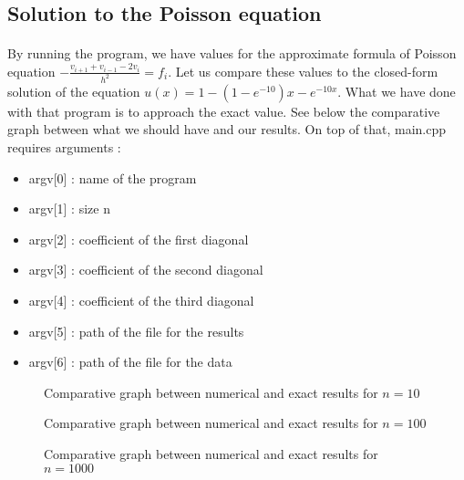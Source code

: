 \documentclass[a4paper, twoside, 11pt]{report}
\theoremstyle{theorem}
\theoremstyle{remark}
\theoremstyle{exemple}
\begin{document}
			\subsection{Solution to the Poisson equation}
			\paragraph{} By running the program, we have values for the approximate formula of Poisson equation $-\frac{v_{i+1} + v_{i-1} - 2v_{i}}{h^2} = f_{i}$. Let us compare these values to the closed-form solution of the equation $u(x) = 1 - ( 1 - e^{-10} ) x - e ^{-10x}$. What we have done with that program is to approach the exact value. See below the comparative graph between what we should have and our results. On top of that, main.cpp requires arguments :
				\begin{itemize}
				\item{argv[0] : name of the program} 
				\item{argv[1] : size n}
				\item{argv[2] : coefficient of the first diagonal}
				\item{argv[3] : coefficient of the second diagonal}
				\item{argv[4] : coefficient of the third diagonal}
				\item{argv[5] : path of the file for the results}
				\item{argv[6] : path of the file for the data}
				
			\end{itemize}
				
			
			\begin{figure}[htbp]
					\begin{center}
							
					\end{center}
					\caption{Comparative graph between numerical and exact results for $n=10$}
			\end{figure}
				
			\begin{figure}[htbp]
					\begin{center}
							
					\end{center}
					\caption{Comparative graph between numerical and exact results for $n=100$}
			\end{figure}
			
			\begin{figure}[htbp]
					\begin{center}
							
					\end{center}
					\caption{Comparative graph between numerical and exact results for $n=1000$}
			\end{figure}
			
\end{document}
